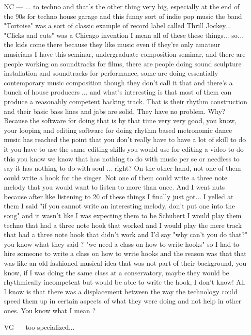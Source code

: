 NC — ... to techno and that's the other thing very big, especially at the end of the 90s for techno house garage and this funny sort of indie pop music the band "Tortoise" was a sort of classic example of record label called Thrill Jockey... "Clicks and cuts" was a Chicago invention I mean all of these these things... so... the kids come there because they like music even if they're only amateur musicians I have this seminar, undergraduate composition seminar, and there are people working on soundtracks for films, there are people doing sound sculpture installation and soundtracks for performance, some are doing essentially contemporary music composition though they don't call it that and there's a bunch of house producers ... and what's interesting is that most of them can produce a reasonably competent backing track. That is their rhythm construction and their basic bass lines and jabs are solid. They have no problem. Why? Because the software for doing that is by that time very very good, you know, your looping and editing software for doing rhythm based metronomic dance music has reached the point that you don't really have to have a lot of skill to do it you have to use the same editing skills you would use for editing a video to do this you know we know that has nothing to do with music per se or needless to say it has nothing to do with soul ... right? On the other hand,  not one of them could write a hook for the singer. Not one of them could write a three note melody that you would want to listen to more than once. And I went nuts because after like listening to 20 of these things I finally just got... I yelled at them I said "if you cannot write an interesting melody, don't put one into the song" and it wasn't like I was expecting them to be Schubert I would play them techno that had a three note hook that worked and I would play the mere track that had a three note hook that didn't work and I'd say "why can't you do that?" you know what they said ? "we need a class on how to write hooks" so I had to hire someone to write a class on how to write hooks and the reason was that that was like an old-fashioned musical idea that was not part of their background, you know, if I was doing the same class at a conservatory, maybe they would be rhythmically incompetent but would be able to write the hook, I don't know! All I know is that there was a displacement between the way the technology could speed them up in certain aspects of what they were doing and not help in other ones. You know what I mean ? 

VG — too specialized... 

